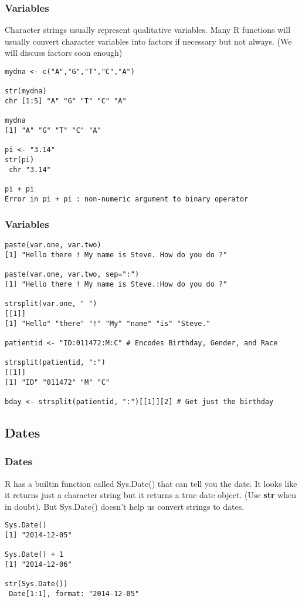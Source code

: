 \documentclass{beamer}
\begin{document}
\begin{frame}[fragile]
\frametitle{Variables}
Character strings usually represent qualitative variables. Many R functions will usually convert character variables into factors if necessary but not always. (We will discuss factors soon enough) 
\newline
\footnotesize
\begin{verbatim}
mydna <- c("A","G","T","C","A")

str(mydna)
chr [1:5] "A" "G" "T" "C" "A"

mydna
[1] "A" "G" "T" "C" "A"

pi <- "3.14"
str(pi)
 chr "3.14"
 
pi + pi
Error in pi + pi : non-numeric argument to binary operator
\end{verbatim}
\end{frame}

\begin{frame}[fragile]
\frametitle{Variables}
\footnotesize
\begin{verbatim}
paste(var.one, var.two)
[1] "Hello there ! My name is Steve. How do you do ?"

paste(var.one, var.two, sep=":")
[1] "Hello there ! My name is Steve.:How do you do ?"

strsplit(var.one, " ")
[[1]]
[1] "Hello" "there" "!" "My" "name" "is" "Steve."

patientid <- "ID:011472:M:C" # Encodes Birthday, Gender, and Race

strsplit(patientid, ":")
[[1]]
[1] "ID" "011472" "M" "C"

bday <- strsplit(patientid, ":")[[1]][2] # Get just the birthday

\end{verbatim}
\end{frame}



\subsection{Dates}


\begin{frame}[fragile]
\frametitle{Dates}
R has a builtin function called Sys.Date() that can tell you the date. It looks like it returns just a character string but it returns a true date object. (Use \textbf{str} when in doubt). But Sys.Date() doesn't help us convert strings to dates. 
\newline
\begin{verbatim}
Sys.Date()
[1] "2014-12-05"

Sys.Date() + 1
[1] "2014-12-06"

str(Sys.Date())
 Date[1:1], format: "2014-12-05"
\end{verbatim}
\end{frame}
\end{document}
